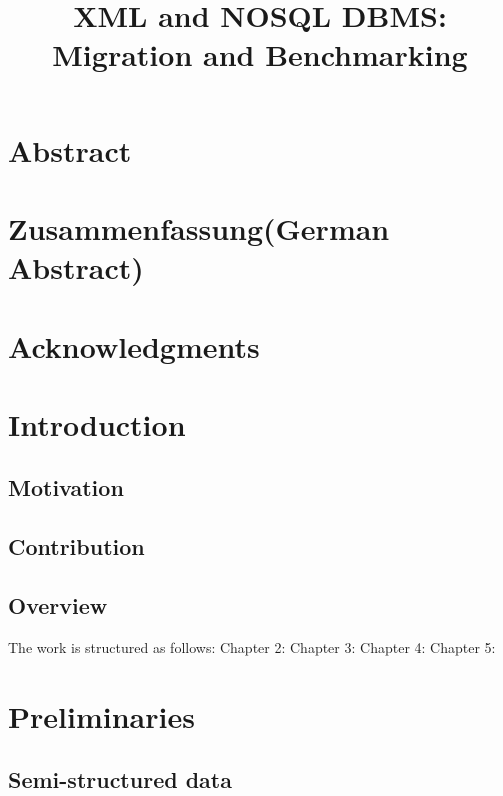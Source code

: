 \documentclass[a4paper,12pt]{article}
\title{XML and NOSQL DBMS: Migration and Benchmarking}
\subtitle{
}
\begin{document}
	
	\renewcommand{\lstlistingname}{Code}
	
	
	\maketitle
	\thispagestyle{empty}
	
	\newpage
	\section*{Abstract}
	
	\thispagestyle{empty}	
	\newpage
	\section*{Zusammenfassung(German Abstract)}
	
	\newpage
	\section*{Acknowledgments}
	
	\thispagestyle{empty}
	\newpage
	\tableofcontents
	\thispagestyle{empty}
	\newpage
	\section{Introduction}
	\setcounter{page}{1}
	\subsection{Motivation}
		
	
	\subsection{Contribution}
		
		
	\subsection{Overview}
		
		The work is structured as follows:
		Chapter 2:
		Chapter 3:
		Chapter 4:
		Chapter 5: 
		
	\newpage
	\section{Preliminaries}
		\subsection{Semi-structured data}
\end{document}
